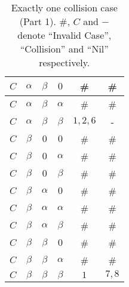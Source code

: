 \documentclass[fleqn]{article}
\begin{document}
\begin {table}
\begin{tabular}{|c|c|c|c|c|c|}
\hline
$C$ & $\alpha$ & $\beta$ & $0$ & \# & \# \\
\hline
$C$ & $\alpha$ & $\beta$ & $\alpha$ & \# & \# \\
\hline
$C$ & $\alpha$ & $\beta$ & $\beta$ & $1, 2, 6$ & - \\
\hline
$C$ & $\beta$ & $0$ & $0$ & \# & \# \\
\hline
$C$ & $\beta$ & $0$ & $\alpha$ & \# & \# \\
\hline
$C$ & $\beta$ & $0$ & $\beta$ & \# & \# \\
\hline
$C$ & $\beta$ & $\alpha$ & $0$ & \# & \# \\
\hline
$C$ & $\beta$ & $\alpha$ & $\alpha$ & \# & \# \\
\hline
$C$ & $\beta$ & $\alpha$ & $\beta$ & \# & \# \\
\hline
$C$ & $\beta$ & $\beta$ & $0$ & \# & \# \\
\hline
$C$ & $\beta$ & $\beta$ & $\alpha$ & \# & \# \\
\hline
$C$ & $\beta$ & $\beta$ & $\beta$ & $1$ & $7, 8$ \\
\hline
\end{tabular}
\caption{Exactly one collision case (Part 1). \#, $C$ and $-$ denote ``Invalid Case'', ``Collision'' and  ``Nil'' respectively.}
\label{Tab_OneC1}
\end{table}
\end{document}
